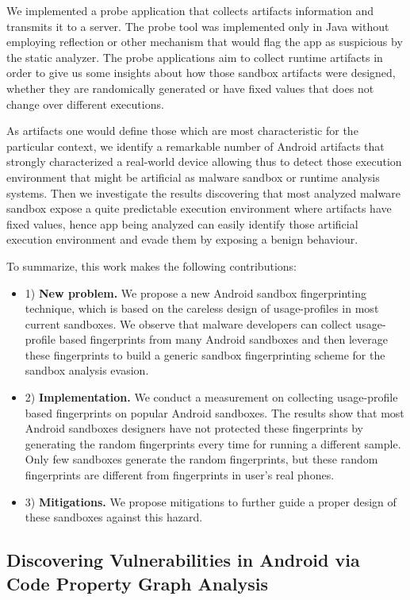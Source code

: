 We implemented a probe application that collects artifacts information and transmits it to a server. The probe tool was implemented only in Java without employing reflection or other mechanism that would flag the app as suspicious by the static analyzer. The probe applications aim to collect runtime artifacts in order to give us some insights about how those sandbox artifacts were designed, whether they are randomically generated or have fixed values that does not change over different executions. 

As artifacts one would define those which are most characteristic for the particular context, we identify a remarkable number of Android artifacts that strongly characterized a real-world device allowing thus to detect those execution environment that might be artificial as malware sandbox or runtime analysis systems. Then we investigate the results discovering that most analyzed malware sandbox expose a quite predictable execution environment where artifacts have fixed values, hence app being analyzed can easily identify those artificial execution environment and evade them by exposing a benign behaviour.

To summarize, this work makes the following contributions:
\begin{itemize}
\item 1) {\bf New problem.} We propose a new Android sandbox fingerprinting technique, which is based on the careless design of usage-profiles in most current sandboxes. We observe that malware developers can collect usage-profile based fingerprints from many Android sandboxes and then leverage these fingerprints to build a generic sandbox fingerprinting scheme for the sandbox analysis evasion. 
\item 2) {\bf Implementation.} We conduct a measurement on collecting usage-profile based fingerprints on popular Android sandboxes. The results show that most Android sandboxes designers have not protected these fingerprints by generating the random fingerprints every time for running a different sample. Only few sandboxes generate the random fingerprints, but these random fingerprints are different from fingerprints in user's real phones.
\item 3) {\bf Mitigations.} We propose mitigations to further guide a proper design of these sandboxes against this hazard.
\end{itemize}

\subsection{Discovering Vulnerabilities in Android via Code Property Graph Analysis}

